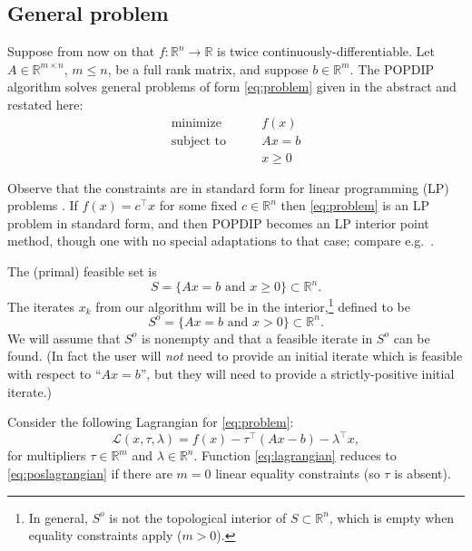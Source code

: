 \documentclass[11pt]{article}
\newcommand{\RR}{\mathbb{R}}
\begin{document}
\subsection*{General problem}

Suppose from now on that $f:\RR^n \to \RR$ is twice continuously-differentiable.  Let $A\in\RR^{m\times n}$, $m\le n$, be a full rank matrix, and suppose $b\in\RR^m$.  The POPDIP algorithm solves general problems of form \eqref{eq:problem} given in the abstract and restated here:
\begin{equation}
\begin{matrix}
\text{minimize} \qquad   & f(x) \\
\text{subject to} \qquad & A x = b \\
                         & x \ge 0
\end{matrix} \tag{1}
\end{equation}

Observe that the constraints are in standard form for linear programming (LP) problems \cite[chapter 4]{GrivaNashSofer2009}.  If $f(x)=c^\top x$ for some fixed $c\in\RR^n$ then \eqref{eq:problem} is an LP problem in standard form, and then POPDIP becomes an LP interior point method, though one with no special adaptations to that case; compare e.g.~\cite{ZhangTapiaDennis1992}.

The (primal) feasible set is
\begin{equation}
S = \{Ax=b \text{ and } x\ge 0\} \subset \RR^n.  \label{eq:primalfeasible}
\end{equation}
The iterates $x_k$ from our algorithm will be in the interior,\footnote{In general, $S^o$ is not the topological interior of $S \subset \RR^n$, which is empty when equality constraints apply ($m>0$).} defined to be
\begin{equation}
S^o = \{Ax=b \text{ and } x > 0\} \subset \RR^n.  \label{eq:primalinterior}
\end{equation}
We will assume that $S^o$ is nonempty and that a feasible iterate in $S^o$ can be found.  (In fact the user will \emph{not} need to provide an initial iterate which is feasible with respect to ``$Ax=b$'', but they will need to provide a strictly-positive initial iterate.)

Consider the following Lagrangian for \eqref{eq:problem}:
\begin{equation}
\mathcal{L}(x,\tau,\lambda) = f(x) - \tau^\top (Ax - b) - \lambda^\top x, \label{eq:lagrangian}
\end{equation}
for multipliers $\tau\in\RR^m$ and $\lambda\in \RR^n$.  Function \eqref{eq:lagrangian} reduces to \eqref{eq:poslagrangian} if there are $m=0$ linear equality constraints (so $\tau$ is absent).
\end{document}
